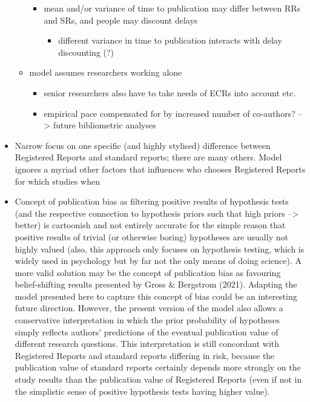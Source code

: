\documentclass[
  ,man,mask,floatsintext]{apa6}
\providecommand{\tightlist}{%
  \setlength{\itemsep}{0pt}\setlength{\parskip}{0pt}}
\begin{document}
\begin{itemize}
\begin{itemize}
    \begin{itemize}
    \tightlist
    \item
      mean and/or variance of time to publication may differ between RRs and SRs, and people may discount delays

      \begin{itemize}
      \tightlist
      \item
        different variance in time to publication interacts with delay discounting (?)
      \end{itemize}
    \end{itemize}
  \item
    model assumes researchers working alone

    \begin{itemize}
    \tightlist
    \item
      senior researchers also have to take needs of ECRs into account etc.
    \item
      empirical pace compensated for by increased number of co-authors? --\textgreater{} future bibliometric analyses
    \end{itemize}
  \end{itemize}
\item
  Narrow focus on one specific (and highly stylised) difference between Registered Reports and standard reports; there are many others. Model ignores a myriad other factors that influences who chooses Registered Reports for which studies when
\item
  Concept of publication bias as filtering positive results of hypothesis tests (and the respective connection to hypothesis priors such that high priors --\textgreater{} better) is cartoonish and not entirely accurate for the simple reason that positive results of trivial (or otherwise boring) hypotheses are usually not highly valued (also, this approach only focuses on hypothesis testing, which is widely used in psychology but by far not the only means of doing science).
  A more valid solution may be the concept of publication bias as favouring belief-shifting results presented by Gross \& Bergstrom (2021).
  Adapting the model presented here to capture this concept of bias could be an interesting future direction.
  However, the present version of the model also allows a conservative interpretation in which the prior probability of hypotheses simply reflects authors' predictions of the eventual publication value of different research questions.
  This interpretation is still concordant with Registered Reports and standard reports differing in risk, because the publication value of standard reports certainly depends more strongly on the study results than the publication value of Registered Reports (even if not in the simplistic sense of positive hypothesis tests having higher value).

\end{itemize}
\end{document}
